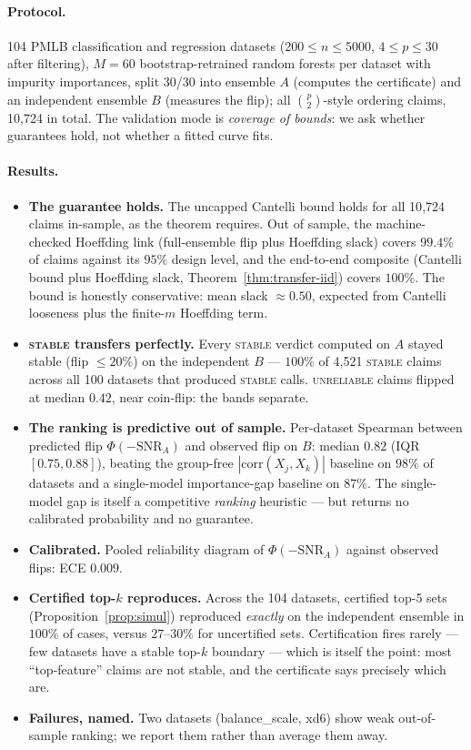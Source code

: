 \documentclass[10pt]{article}
\newcommand{\snr}{\mathrm{SNR}}
\newcommand{\stab}{\textsc{stable}}
\newcommand{\unrel}{\textsc{unreliable}}
\begin{document}
\paragraph{Protocol.} 104 PMLB classification and regression datasets ($200\le n\le
5000$, $4\le p\le 30$ after filtering), $M=60$ bootstrap-retrained random forests per
dataset with impurity importances, split 30/30 into ensemble $A$ (computes the
certificate) and an independent ensemble $B$ (measures the flip); all
$\binom{p}{2}$-style ordering claims, 10{,}724 in total. The validation mode is
\emph{coverage of bounds}: we ask whether guarantees hold, not whether a fitted curve
fits.

\paragraph{Results.}
\begin{itemize}[leftmargin=1.5em,itemsep=1pt,topsep=2pt]
\item \textbf{The guarantee holds.} The uncapped Cantelli bound holds for all 10{,}724
  claims in-sample, as the theorem requires. Out of sample, the machine-checked
  Hoeffding link (full-ensemble flip plus Hoeffding slack) covers $99.4\%$ of claims
  against its $95\%$ design level, and the end-to-end composite (Cantelli bound plus
  Hoeffding slack, Theorem~\ref{thm:transfer-iid}) covers $100\%$. The bound is
  honestly conservative: mean slack ${\approx}0.50$, expected from Cantelli looseness
  plus the finite-$m$ Hoeffding term.
\item \textbf{\stab{} transfers perfectly.} Every \stab{} verdict computed on $A$ stayed
  stable (flip $\le 20\%$) on the independent $B$ --- $100\%$ of 4{,}521 \stab{} claims
  across all 100 datasets that produced \stab{} calls. \unrel{} claims flipped at median
  $0.42$, near coin-flip: the bands separate.
\item \textbf{The ranking is predictive out of sample.} Per-dataset Spearman between
  predicted flip $\Phi(-\snr_A)$ and observed flip on $B$: median $0.82$ (IQR
  $[0.75,0.88]$), beating the group-free $|\mathrm{corr}(X_j,X_k)|$ baseline on $98\%$
  of datasets and a single-model importance-gap baseline on $87\%$. The single-model gap
  is itself a competitive \emph{ranking} heuristic --- but returns no calibrated
  probability and no guarantee.
\item \textbf{Calibrated.} Pooled reliability diagram of $\Phi(-\snr_A)$ against
  observed flips: ECE $0.009$.
\item \textbf{Certified top-$k$ reproduces.} Across the 104 datasets, certified top-5
  sets (Proposition~\ref{prop:simul}) reproduced \emph{exactly} on the independent
  ensemble in $100\%$ of cases, versus $27$--$30\%$ for uncertified sets. Certification
  fires rarely --- few datasets have a stable top-$k$ boundary --- which is itself the
  point: most ``top-feature'' claims are not stable, and the certificate says precisely
  which are.
\item \textbf{Failures, named.} Two datasets (balance\_scale, xd6) show weak
  out-of-sample ranking; we report them rather than average them away.
\end{itemize}
\end{document}

